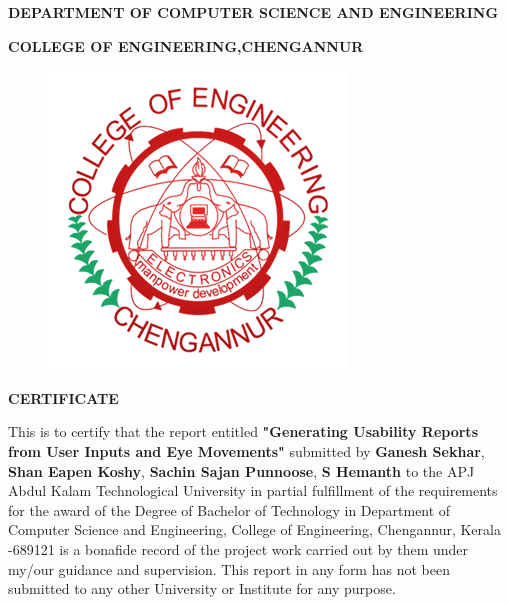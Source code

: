 \documentclass[hidelinks,12pt,a4paper,final]{extreport}
\begin{document}
\begin{center}\fontsize{14}{17} \selectfont \textbf{DEPARTMENT OF COMPUTER SCIENCE AND ENGINEERING}\end{center}
\begin{center}\fontsize{14}{17} \selectfont \textbf{COLLEGE OF ENGINEERING,CHENGANNUR}\end{center}
\begin{figure}[h]
	\begin{center}
		\includegraphics[scale=.33]{ceclogo.png}
		\vspace{.1 cm}
	\end{center}
\end{figure}

\begin{center}\fontsize{14}{17} \selectfont \textbf{CERTIFICATE}\end{center}
This is to certify that the report entitled \textbf{{\large "Generating Usability Reports from User Inputs and Eye Movements"}} submitted by \textbf{Ganesh Sekhar}, \textbf{Shan Eapen Koshy}, \textbf{Sachin Sajan Punnoose}, \textbf{S Hemanth} to the APJ Abdul Kalam Technological University in partial fulfillment of the requirements for the award of the Degree of Bachelor of Technology in Department of Computer Science and Engineering, College of Engineering, Chengannur, Kerala -689121 is a bonafide record of the project work carried out by them under my/our guidance and supervision. This report in any form has not been submitted to any other University or Institute for any purpose.
\end{document}
